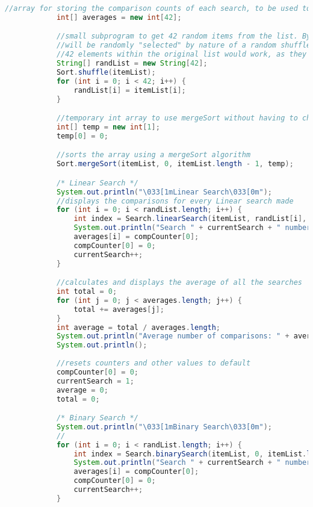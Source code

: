 \documentclass[letterpaper, 10pt,DIV=13]{scrartcl}
\numberwithin{equation}{section} %
\numberwithin{figure}{section} %
\numberwithin{table}{section} %
\begin{document}
\begin{lstlisting}[frame=single, language=java, breaklines]
            //array for storing the comparison counts of each search, to be used to find the average
            int[] averages = new int[42];

            //small subprogram to get 42 random items from the list. By shuffling the original list randomly, the first 42 elements
            //will be randomly "selected" by nature of a random shuffle and then just using those values. Technically, any range of
            //42 elements within the original list would work, as they would all be randomized.
            String[] randList = new String[42];
            Sort.shuffle(itemList);
            for (int i = 0; i < 42; i++) {
                randList[i] = itemList[i];
            }

            //temporary int array to use mergeSort without having to change it completely
            int[] temp = new int[1];
            temp[0] = 0;

            //sorts the array using a mergeSort algorithm
            Sort.mergeSort(itemList, 0, itemList.length - 1, temp);

            /* Linear Search */
            System.out.println("\033[1mLinear Search\033[0m");
            //displays the comparisons for every Linear search made
            for (int i = 0; i < randList.length; i++) {
                int index = Search.linearSearch(itemList, randList[i], compCounter);
                System.out.println("Search " + currentSearch + " number of comparisons: \033[1m" + compCounter[0] + "\033[0m. Key (" + randList[i] + ") was found at index " + index);
                averages[i] = compCounter[0];
                compCounter[0] = 0;
                currentSearch++;
            }

            //calculates and displays the average of all the searches
            int total = 0;
            for (int j = 0; j < averages.length; j++) {
                total += averages[j];
            }
            int average = total / averages.length;
            System.out.println("Average number of comparisons: " + average);
            System.out.println();
            
            //resets counters and other values to default
            compCounter[0] = 0;
            currentSearch = 1;
            average = 0;
            total = 0;

            /* Binary Search */
            System.out.println("\033[1mBinary Search\033[0m");
            //
            for (int i = 0; i < randList.length; i++) {
                int index = Search.binarySearch(itemList, 0, itemList.length, randList[i], compCounter);
                System.out.println("Search " + currentSearch + " number of comparisons: \033[1m" + compCounter[0] + "\033[0m. Key (" + randList[i] + ") was found at index " + index);
                averages[i] = compCounter[0];
                compCounter[0] = 0;
                currentSearch++;
            }


\end{lstlisting}
\end{document}
